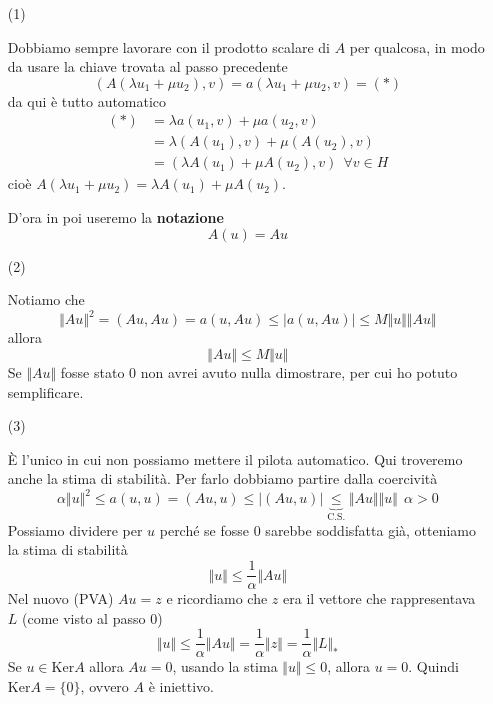 \documentclass[10pt,a4paper,twoside,openright]{book}
\begin{document}
\begin{dimostrazione}
\begin{itemize}
\item[(1)]

Dobbiamo sempre lavorare con il prodotto scalare di $A$ per qualcosa, in modo da usare la chiave trovata al passo precedente
\begin{equation*}
( A( \lambda u_{1} +\mu u_{2}),v) =a( \lambda u_{1} +\mu u_{2},v) =(*)
\end{equation*}
da qui è tutto automatico
\begin{align*}
(*) & =\lambda a(u_{1},v) +\mu a(u_{2},v)\\
 & =\lambda (A(u_{1}),v) +\mu (A(u_{2}),v)\\
 & =(\lambda A(u_{1}) +\mu A(u_{2}),v) \ \ \forall v\in H
\end{align*}
cioè $A( \lambda u_{1} +\mu u_{2}) =\lambda A(u_{1}) +\mu A(u_{2})$.

D'ora in poi useremo la \textbf{notazione}
\begin{equation*}
A(u) =Au
\end{equation*}


\item[(2)]

Notiamo che
\begin{equation*}
\Vert Au\Vert ^{2} =(Au,Au) =a(u,Au) \leqslant | a(u,Au)| \leqslant M\Vert u\Vert \Vert Au\Vert 
\end{equation*}
allora
\begin{equation*}
\Vert Au\Vert \leqslant M\Vert u\Vert 
\end{equation*}
Se $\Vert Au\Vert $ fosse stato $0$ non avrei avuto nulla dimostrare, per cui ho potuto semplificare.



\item[(3)]

È l'unico in cui non possiamo mettere il pilota automatico. Qui troveremo anche la stima di stabilità. Per farlo dobbiamo partire dalla coercività
\begin{equation*}
\alpha \Vert u\Vert ^{2} \leqslant a(u,u) =(Au,u) \leqslant | (Au,u)| \underbrace{\leqslant }_{\text{C.S.}}\Vert Au\Vert \Vert u\Vert \ \ \alpha  >0
\end{equation*}
Possiamo dividere per $u$ perché se fosse $0$ sarebbe soddisfatta già, otteniamo la stima di stabilità
\begin{equation*}
\Vert u\Vert \leqslant \frac{1}{\alpha }\Vert Au\Vert 
\end{equation*}
Nel nuovo (PVA) $Au=z$ e ricordiamo che $z$ era il vettore che rappresentava $L$ (come visto al passo 0)
\begin{equation*}
\Vert u\Vert \leqslant \frac{1}{\alpha }\Vert Au\Vert =\frac{1}{\alpha }\Vert z\Vert =\frac{1}{\alpha }\Vert L\Vert _{*}
\end{equation*}
Se $u\in \mathrm{Ker} A$ allora $Au=0$, usando la stima $\Vert u\Vert \leqslant 0$, allora $u=0$. Quindi $\mathrm{Ker} A=\{0\}$, ovvero $A$ è iniettivo.




\end{itemize}
\end{dimostrazione}
\end{document}

